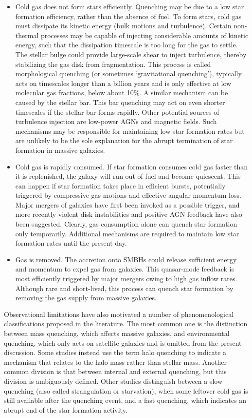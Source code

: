 \documentclass[a4paper,11pt]{article}
\begin{document}
\begin{itemize}
    \item Cold gas does not form stars efficiently. Quenching may be due to a low star formation efficiency, rather than the absence of fuel. To form stars, cold gas must dissipate its kinetic energy (bulk motions and turbulence). Certain non-thermal processes may be capable of injecting considerable amounts of kinetic energy, such that the dissipation timescale is too long for the gas to settle. The stellar bulge could provide large-scale shear to inject turbulence, thereby stabilizing the gas disk from fragmentation. This process is called morphological quenching (or sometimes `gravitational quenching'), typically acts on timescales longer than a billion years and is only effective at low molecular gas fractions, below about 10\%. A similar mechanism can be caused by the stellar bar. This bar quenching may act on even shorter timescales if the stellar bar forms rapidly. Other potential sources of turbulence injection are low-power AGNs and magnetic fields. Such mechanisms may be responsible for maintaining low star formation rates but are unlikely to be the sole explanation for the abrupt termination of star formation in massive galaxies.
    \item Cold gas is rapidly consumed. If star formation consumes cold gas faster than it is replenished, the galaxy will run out of fuel and become quiescent. This can happen if star formation takes place in efficient bursts, potentially triggered by compressive gas motions and effective angular momentum loss. Major mergers of galaxies have first been invoked as a possible trigger, and more recently violent disk instabilities and positive AGN feedback have also been suggested. Clearly, gas consumption alone can quench star formation only temporarily. Additional mechanisms are required to maintain low star formation rates until the present day.
    \item Gas is removed. The accretion onto SMBHs could release sufficient energy and momentum to expel gas from galaxies. This quasar-mode feedback is most efficiently triggered by major mergers owing to high gas inflow rates. Although rare and short-lived, this process can quench star formation by removing the gas supply from massive galaxies.
\end{itemize}

{\noindent}Observational limitations have also motivated a number of phenomenological classifications proposed in the literature. The most common one is the distinction between mass quenching, which affects massive galaxies, and environmental quenching, which only acts on satellite galaxies and is omitted from the present discussion. Some studies instead use the term halo quenching to indicate a mechanism that relates to the halo mass rather than stellar mass. Another common division is that between internal and external quenching, but this division is ambiguously defined. Other studies distinguish between a slow quenching (also called strangulation or starvation), when some leftover cold gas is still available after the quenching event, and a fast quenching, which indicates an abrupt end of the star formation activity.
\end{document}
